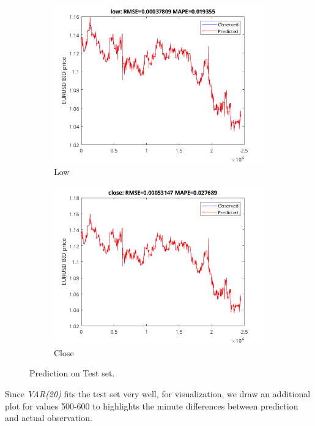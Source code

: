 \documentclass[11pt]{article}
\begin{document}
\begin{figure}[H]
\begin{subfigure}[b]{0.5\textwidth}
      \includegraphics[width=\textwidth,keepaspectratio]{figs/var20low.png}
      \caption{Low}
    \end{subfigure}
    \quad\quad\quad\quad\quad\quad\quad
    \begin{subfigure}[b]{0.5\textwidth}
      \includegraphics[width=\textwidth,keepaspectratio]{figs/var20close.png}
      \caption{Close}
    \end{subfigure}
    \caption{Prediction on Test set.}
\end{figure}

Since \textit{VAR(20)} fits the test set very well, for visualization, we draw
an additional plot for values 500-600 to highlights the minute differences
between prediction and actual observation. 
\end{document}
